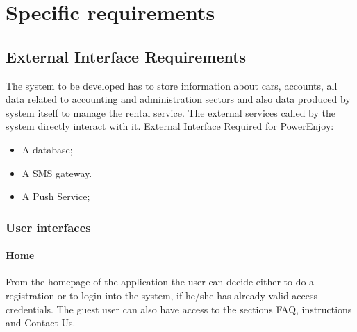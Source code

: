 \chapter{Specific requirements}

\section{External Interface Requirements }
The system to be developed has to store information about cars, accounts, all data related to accounting and administration sectors and also data produced by system itself to manage the rental service. The external services called by the system directly interact with it.
External Interface Required for PowerEnjoy:
\begin{itemize}
\item A database;
\item A SMS gateway.
\item A Push Service;
\end{itemize}

\subsection{User interfaces}
\subsubsection{Home}
From the homepage of the application the user can decide either to do a registration or to login into the system, if he/she has already valid access credentials.
The guest user can also have access to the sections FAQ, instructions and Contact Us.

